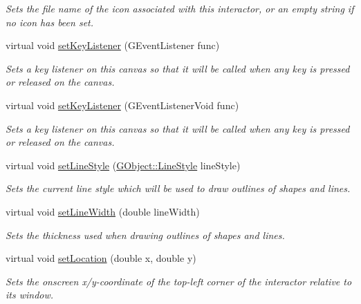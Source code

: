 \begin{DoxyCompactItemize}
\begin{DoxyCompactList}\small\item\em Sets the file name of the icon associated with this interactor, or an empty string if no icon has been set. \end{DoxyCompactList}\item 
virtual void \mbox{\hyperlink{classGCanvas_aeb8324d3287fa1fbe093f4d6230cf0a6}{set\+Key\+Listener}} (G\+Event\+Listener func)
\begin{DoxyCompactList}\small\item\em Sets a key listener on this canvas so that it will be called when any key is pressed or released on the canvas. \end{DoxyCompactList}\item 
virtual void \mbox{\hyperlink{classGCanvas_ae48ecea73606c7bd9423e1c7cc589cc9}{set\+Key\+Listener}} (G\+Event\+Listener\+Void func)
\begin{DoxyCompactList}\small\item\em Sets a key listener on this canvas so that it will be called when any key is pressed or released on the canvas. \end{DoxyCompactList}\item 
virtual void \mbox{\hyperlink{classGDrawingSurface_a6bfe14a77101db0fb97b5a7e07a5526b}{set\+Line\+Style}} (\mbox{\hyperlink{classGObject_a86e0f5648542856159bb40775c854aa7}{G\+Object\+::\+Line\+Style}} line\+Style)
\begin{DoxyCompactList}\small\item\em Sets the current line style which will be used to draw outlines of shapes and lines. \end{DoxyCompactList}\item 
virtual void \mbox{\hyperlink{classGDrawingSurface_afd6a47c6ea6a1f85ca05a65ba3ff3477}{set\+Line\+Width}} (double line\+Width)
\begin{DoxyCompactList}\small\item\em Sets the thickness used when drawing outlines of shapes and lines. \end{DoxyCompactList}\item 
virtual void \mbox{\hyperlink{classGInteractor_a04594e8ba9b98513a64f1da00dcae18c}{set\+Location}} (double x, double y)
\begin{DoxyCompactList}\small\item\em Sets the onscreen x/y-\/coordinate of the top-\/left corner of the interactor relative to its window. \end{DoxyCompactList}\item 

\end{DoxyCompactItemize}
